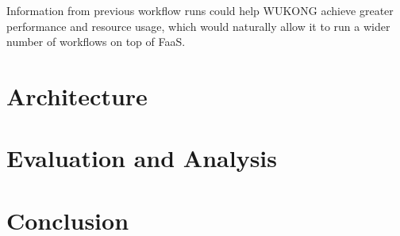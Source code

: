 \documentclass[conference]{IEEEtran}
\begin{document}
Information from previous workflow runs could help WUKONG achieve greater performance and resource usage, which would naturally allow it to run a wider number of workflows on top of FaaS.

\section{Architecture}


\section{Evaluation and Analysis}

\section{Conclusion}



\end{document}
